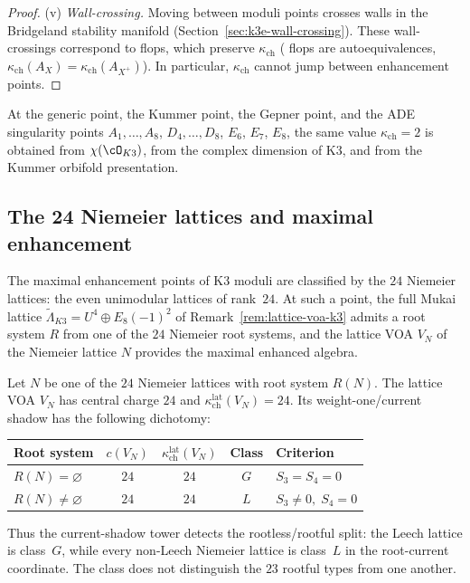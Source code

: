 \begin{proof}
(v) \emph{Wall-crossing.} Moving between moduli points crosses walls
in the Bridgeland stability manifold (Section~\ref{sec:k3e-wall-crossing}). These
wall-crossings correspond to flops, which preserve $\kappa_{\mathrm{ch}}$ (
flops are autoequivalences, $\kappa_{\mathrm{ch}}(A_X) = \kappa_{\mathrm{ch}}(A_{X^+})$). In
particular, $\kappa_{\mathrm{ch}}$ cannot jump between enhancement points.
\end{proof}
At the generic point, the Kummer point, the Gepner point, and the ADE
singularity points \(A_1,\ldots,A_8\), \(D_4,\ldots,D_8\), \(E_6\),
\(E_7\), \(E_8\), the same value \(\kappa_{\mathrm{ch}}=2\) is obtained
from \(\chi(\cO_{K3})\), from the complex dimension of K3, and from
the Kummer orbifold presentation.

\subsection{The 24 Niemeier lattices and maximal enhancement}
\label{subsec:k3-niemeier-landscape}

The maximal enhancement points of K3 moduli are classified by
the $24$ Niemeier lattices: the even unimodular lattices of rank~$24$.
At such a point, the full Mukai lattice
$\widetilde{\Lambda}_{K3} = U^4 \oplus E_8(-1)^2$ of
Remark~\ref{rem:lattice-voa-k3} admits a root system $R$ from one
of the $24$ Niemeier root systems, and the lattice VOA $V_N$
of the Niemeier lattice $N$ provides the maximal enhanced algebra.

\begin{proposition}
\label{prop:niemeier-shadow-landscape}
Let $N$ be one of the $24$ Niemeier lattices with root system $R(N)$.
The lattice VOA $V_N$ has central charge \(24\) and
\(\kappa_{\mathrm{ch}}^{\mathrm{lat}}(V_N)=24\). Its weight-one/current
shadow has the following dichotomy:
\begin{center}
\renewcommand{\arraystretch}{1.3}
\begin{tabular}{lcccl}
\toprule
\textbf{Root system} & $c(V_N)$ & $\kappa_{\mathrm{ch}}^{\mathrm{lat}}(V_N)$ & \textbf{Class} & \textbf{Criterion} \\
\midrule
$R(N)=\varnothing$ & $24$ & $24$ & $G$ & $S_3=S_4=0$ \\
$R(N)\neq\varnothing$ & $24$ & $24$ & $L$ & $S_3\neq0,\;S_4=0$ \\
\bottomrule
\end{tabular}
\end{center}
Thus the current-shadow tower detects the rootless/rootful split:
the Leech lattice is class~$G$, while every non-Leech Niemeier lattice is
class~$L$ in the root-current coordinate. The class does not distinguish
the \(23\) rootful types from one another.
\end{proposition}

